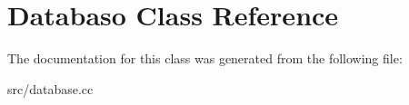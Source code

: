 \hypertarget{classDatabaso}{\section{Databaso Class Reference}
\label{classDatabaso}
}


The documentation for this class was generated from the following file\-:\begin{DoxyCompactItemize}
\item 
src/database.\-cc\end{DoxyCompactItemize}
